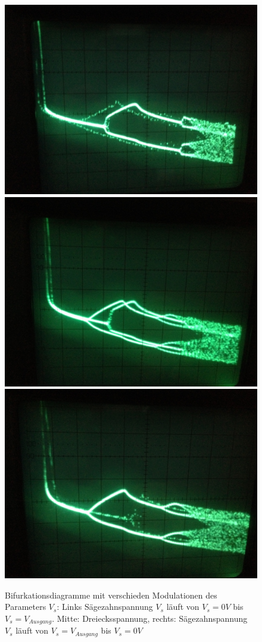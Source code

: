 \documentclass[12pt,a4paper]{article}
\begin{document}
\begin{figure}[!htbp]
\centering
\includegraphics[scale=0.12]{bif-ldr/dreieck_1}
\includegraphics[scale=0.12]{bif-ldr/dreieck_2}
\includegraphics[scale=0.12]{bif-ldr/dreieck_3}
\caption{Bifurkationsdiagramme mit verschieden Modulationen des Parameters $V_s$: Links Sägezahnspannung $V_s$ läuft von $V_s=0V$ bis $V_s=V_{Ausgang}$. Mitte: Dreiecksspannung, rechts: Sägezahnspannung $V_s$ läuft von $V_s=V_{Ausgang}$ bis $V_s=0V$}
\label{fig:ldr-modellierung}
\end{figure}
\end{document}
